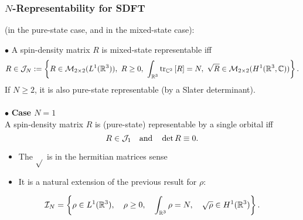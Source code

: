 \documentclass[9pt,xcolor=dvipsnames]{beamer}
\begin{document}
\begin{frame}


\frametitle{$N$-Representability for SDFT}

 (in the pure-state case, and in the mixed-state case):

\begin{theorem}[DG 2013\footnotemark]
	$\bullet$ A spin-density matrix $R$ is mixed-state representable iff
	\[
		R \in \cJ_N :=  \left\{ R \in \cM_{2 \times 2} (L^1(\R^3)), \ R \ge 0, \ \int_{\R^3} \tr_{\C^2} \left[ R \right] = N, \ \sqrt{R} \in \cM_{2 \times 2} (H^1(\R^3, \C)) \right\}.
	\]
	If $N \ge 2$, it is also pure-state representable (by a Slater determinant).\\
	~\\
	$\bullet$ \textbf{Case $N=1$}\\
	 A spin-density matrix $R$ is (pure-state) representable by a single orbital iff
	\[
		R \in {\mathcal J}_1 \quad \text{and} \quad \det{R} \equiv 0.
	\]
\end{theorem}

\begin{itemize}
	\item The $\sqrt{}$ is in the hermitian matrices sense
	\item  It is a natural extension of the previous result for $\rho$:
\end{itemize}
	\[
		{\mathcal I}_N = \left\{ \rho \in L^1({\mathbb R}^3), \quad \rho \ge 0, \quad \int_{{\mathbb R}^3} \rho = N, \quad \sqrt{\rho} \in H^1({\mathbb R}^3) \right\}.
	\]

\addtocounter{footnote}{-1}
\end{frame}

\end{document}
